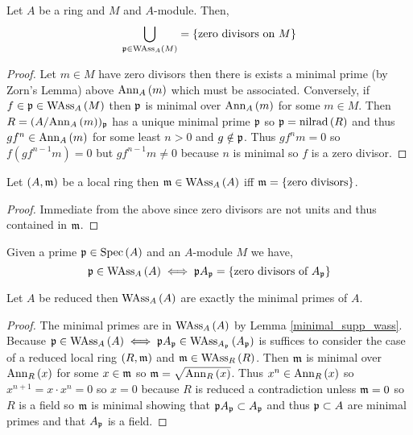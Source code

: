 \documentclass[12pt]{article}
\begin{document}
\begin{lemma}
Let $A$ be a ring and $M$ and $A$-module. Then,
\[ \bigcup_{\mathfrak{p} \in \mathrm{WAss}_{A}\left(M \right)} = \{ \text{zero divisors on } M \} \]
\end{lemma}

\begin{proof}
Let $m \in M$ have zero divisors then there is exists a minimal prime (by Zorn's Lemma) above $\mathrm{Ann}_{A}\left(m\right)$ which must be associated. Conversely, if $f \in \mathfrak{p} \in \mathrm{WAss}_{A}\left(M \right)$ then $\mathfrak{p}$ is minimal over $\mathrm{Ann}_{A}\left(m\right)$ for some $m \in M$. Then $R = (A / \mathrm{Ann}_{A}\left(m\right))_{\mathfrak{p}}$ has a unique minimal prime $\mathfrak{p}$ so $\mathfrak{p} = \mathrm{nilrad}\left( R \right)$ and thus $g f^n \in \mathrm{Ann}_{A}\left(m\right)$ for some least $n > 0$ and $g \notin \mathfrak{p}$. Thus $g f^n m = 0$ so $f (g f^{n-1} m) = 0$ but $g f^{n-1} m \neq 0$ because $n$ is minimal so $f$ is a zero divisor.
\end{proof}

\begin{prop}
Let $(A, \mathfrak{m})$ be a local ring then $\mathfrak{m} \in \mathrm{WAss}_{A}\left(A \right)$ iff $\mathfrak{m} = \{ \text{zero divisors} \}$.
\end{prop}

\begin{proof}
Immediate from the above since zero divisors are not units and thus contained in $\mathfrak{m}$.
\end{proof}

\begin{cor}
Given a prime $\mathfrak{p} \in \mathrm{Spec}\left( A \right)$ and an $A$-module $M$ we have,
\[ \mathfrak{p} \in \mathrm{WAss}_{A}\left(A \right) \iff \mathfrak{p} A_{\mathfrak{p}} = \{ \text{zero divisors of } A_{\mathfrak{p}} \} \]
\end{cor}

\begin{prop}
Let $A$ be reduced then $\mathrm{WAss}_{A}\left(A \right)$ are exactly the minimal primes of $A$.
\end{prop}

\begin{proof}
The minimal primes are in $\mathrm{WAss}_{A}\left(A \right)$ by Lemma \ref{minimal_supp_wass}. Because $\mathfrak{p} \in \mathrm{WAss}_{A}\left(A \right) \iff \mathfrak{p} A_{\mathfrak{p}} \in \mathrm{WAss}_{A_{\mathfrak{p}}}\left(A_{\mathfrak{p}} \right)$ is suffices to consider the case of a reduced local ring $(R, \mathfrak{m})$ and $\mathfrak{m} \in \mathrm{WAss}_{R}\left(R \right)$. Then $\mathfrak{m}$ is minimal over $\mathrm{Ann}_{R}\left(x\right)$ for some $x \in \mathfrak{m}$ so $\mathfrak{m} = \sqrt{\mathrm{Ann}_{R}\left(x\right)}$. Thus $x^n \in \mathrm{Ann}_{R}\left(x\right)$ so $x^{n+1} = x \cdot x^n = 0$ so $x = 0$ because $R$ is reduced a contradiction unless $\mathfrak{m} = 0$ so $R$ is a field so $\mathfrak{m}$ is minimal showing that $\mathfrak{p} A_{\mathfrak{p}} \subset A_{\mathfrak{p}}$ and thus $\mathfrak{p} \subset A$ are minimal primes and that $A_{\mathfrak{p}}$ is a field. 
\end{proof}
\end{document}
